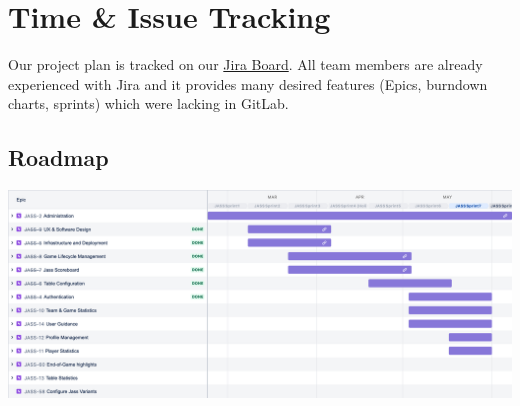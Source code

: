 \section{Time \& Issue Tracking} \label{sec:TimeAndIssueTracking}

Our project plan is tracked on our \href{https://jasstracker-jira.atlassian.net/browse/JASS}{Jira Board}.
All team members are already experienced with Jira and it provides many desired features (Epics, burndown charts, sprints) which were lacking in GitLab.

\subsection{Roadmap}
\includegraphics[width=\textwidth]{resources/jira-roadmap}
